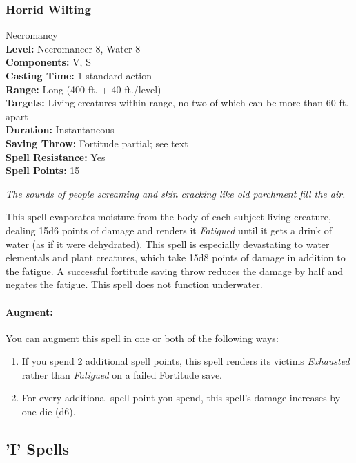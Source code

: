 \subsubsection{Horrid Wilting}
\label{Spell:HorridWilting}
Necromancy
\\ \textbf{Level:} Necromancer 8, Water 8
\\ \textbf{Components:} V, S
\\ \textbf{Casting Time:} 1 standard action
\\ \textbf{Range:} Long (400 ft. + 40 ft./level)
\\ \textbf{Targets:} Living creatures within range, no two of which can be more than 60 ft. apart
\\ \textbf{Duration:} Instantaneous
\\ \textbf{Saving Throw:} Fortitude partial; see text
\\ \textbf{Spell Resistance:} Yes
\\ \textbf{Spell Points:} 15

\emph{The sounds of people screaming and skin cracking like old parchment fill the air.}

This spell evaporates moisture from the body of each subject living creature, dealing 15d6 points of damage 
and renders it \emph{Fatigued} until it gets a drink of water (as if it were dehydrated). 
This spell is especially devastating to water elementals and plant creatures, which take 15d8 points of damage in addition to the fatigue. 
A successful fortitude saving throw reduces the damage by half and negates the fatigue.
This spell does not function underwater.

\paragraph{Augment:} You can augment this spell in one or both of the following ways:
\begin{enumerate}
 \item If you spend 2 additional spell points, this spell renders its victims \emph{Exhausted} rather than \emph{Fatigued} on a failed Fortitude save.
 \item For every additional spell point you spend, this spell's damage increases by one die (d6).
\end{enumerate}
\subsection{'I' Spells}
